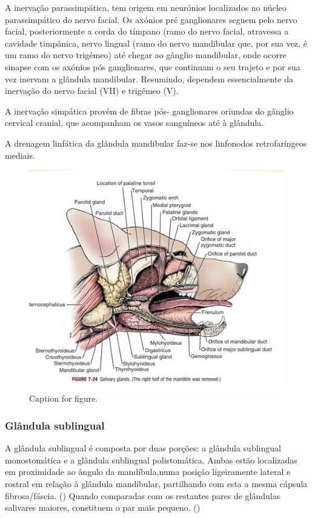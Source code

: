 A inervação parassimpática, tem origem em neurónios localizados no núcleo parassimpático do nervo facial. Os axónios pré ganglionares seguem pelo nervo facial, posteriormente a corda do tímpano (ramo do nervo facial, atravessa a cavidade timpânica, nervo lingual (ramo do nervo mandibular que, por sua vez, é um ramo do nervo trigémeo) até chegar ao gânglio mandibular, onde ocorre sinapse com os axónios pós ganglionares, que continuam o seu trajeto e por sua vez inervam a glândula mandibular. Resumindo, dependem essencialmente da inervação do nervo facial (VII) e trigémeo (V).


A inervação simpática provém de fibras pós- ganglionares  oriundas do gânglio cervical cranial, que acompanham os vasos sanguíneos até à glândula.


A drenagem linfática da glândula mandibular faz-se nos linfonodos retrofaríngeos mediais.


\begin{figure}[!htb]
  \centering
  \includegraphics[width=0.99\textwidth]{../Figures/glls.jpg}
  \caption[Caption for figure in TOC.]{Caption for figure.}
  \label{fig:ggglyjdfg}
\end{figure}

\subsubsection{Glândula sublingual}

A glândula sublingual é composta por duas porções: a glândula sublingual monostomática e a glândula sublingual polistomática. Ambas estão localizadas em proximidade ao ângulo da mandíbula,numa posição ligeiramente lateral e rostral em relação à glândula mandibular, partilhando \cite{Han2016} com esta a mesma cápsula fibrosa/fáscia. (\cite{evans_millers_2012}) \cite{Brown2016} Quando comparadas com os restantes pares de glândulas salivares maiores, constituem o par mais pequeno. (\cite{evans_millers_2012})


